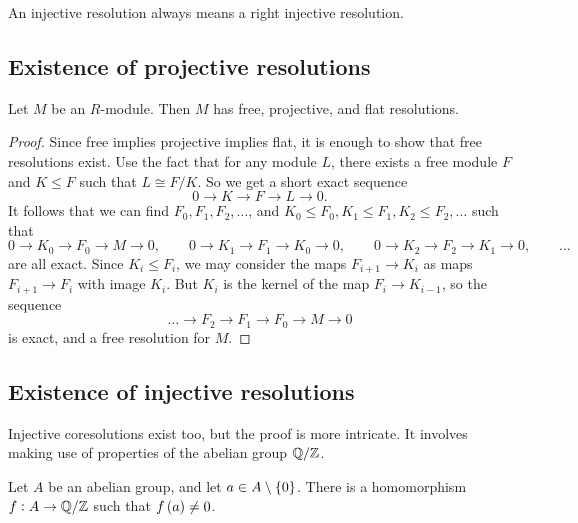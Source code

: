 An injective resolution always means a right injective resolution.

\subsection{Existence of projective resolutions}

\begin{proposition}
Let $ M $ be an $ R $-module. Then $ M $ has free, projective, and flat resolutions.
\end{proposition}

\begin{proof}
Since free implies projective implies flat, it is enough to show that free resolutions exist. Use the fact that for any module $ L $, there exists a free module $ F $ and $ K \le F $ such that $ L \cong F / K $. So we get a short exact sequence
$$ 0 \to K \to F \to L \to 0. $$
It follows that we can find $ F_0, F_1, F_2, \dots $, and $ K_0 \le F_0, K_1 \le F_1, K_2 \le F_2, \dots $ such that
$$ 0 \to K_0 \to F_0 \to M \to 0, \qquad 0 \to K_1 \to F_1 \to K_0 \to 0, \qquad 0 \to K_2 \to F_2 \to K_1 \to 0, \qquad \dots $$
are all exact. Since $ K_i \le F_i $, we may consider the maps $ F_{i + 1} \to K_i $ as maps $ F_{i + 1} \to F_i $ with image $ K_i $. But $ K_i $ is the kernel of the map $ F_i \to K_{i - 1} $, so the sequence
$$ \dots \to F_2 \to F_1 \to F_0 \to M \to 0 $$
is exact, and a free resolution for $ M $.
\end{proof}

\subsection{Existence of injective resolutions}

Injective coresolutions exist too, but the proof is more intricate. It involves making use of properties of the abelian group $ \mathbb{Q} / \mathbb{Z} $.

\begin{proposition}
Let $ A $ be an abelian group, and let $ a \in A \setminus \cbr{0} $. There is a homomorphism $ f : A \to \mathbb{Q} / \mathbb{Z} $ such that $ f\br{a} \ne 0 $. %
\end{proposition}

